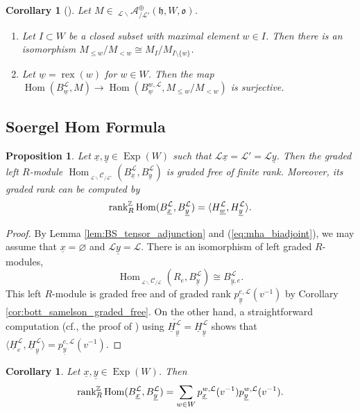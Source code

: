 \documentclass{amsart}
\newcommand{\Z}{\mathbb{Z}}
\newcommand{\scrL}{\mathcal{L}}
\DeclareMathOperator{\Hom}{Hom}
\newcommand{\fr}[1]{\mathfrak{#1}}
\DeclareMathOperator{\rex}{rex}
\newcommand{\Cmon}[2]{\:_{#1 \backslash} \mathcal{C}_{/ #2} }
\newcommand{\Amon}[2]{\:_{#1 \backslash} \mathcal{A}_{/ #2} }
\newcommand{\uH}{\underline{H}}
\DeclareMathOperator{\Exp}{Exp}
\newcommand{\uw}{\underline{w}}
\newcommand{\ux}{\underline{x}}
\newcommand{\uy}{\underline{y}}
\newcommand{\grk}{\textnormal{rank}^{\Z}}
\renewcommand{\emptyset}{\varnothing}
\newtheorem{corollary}[subsubsection]{Corollary}
\newtheorem{proposition}[subsubsection]{Proposition}
\theoremstyle{definition}
\numberwithin{equation}{subsection}
\begin{document}
\begin{corollary}[{\cite[Corollary 3.18]{Abe19}}]\label{cor:when_other_w_invs_is_surj}
    Let $M \in \Amon{\scrL}{\scrL'}^{\oplus} (\fr{h}, W, \fr{o})$.
    \begin{enumerate}
        \item Let $I \subset W$ be a closed subset with maximal element $w \in I$. Then there is an isomorphism $M_{\leq w}/M_{<w} \cong M_{I}/M_{I \setminus \{w\}}$.
        \item Let $\uw = \rex (w)$ for $w \in W$. Then the map $\Hom (B_{\uw}^{\scrL}, M) \to \Hom (B_{\uw}^{w, \scrL}, M_{\leq w} / M_{<w})$ is surjective.
    \end{enumerate}
\end{corollary}

\subsection{Soergel Hom Formula}

\begin{proposition}\label{prop:abe_soergel_hom_formula}
    Let $\ux, \uy \in \Exp (W)$ such that $\scrL \ux = \scrL' = \scrL \uy$.
    Then the graded left $R$-module $\Hom_{\Cmon{\scrL}{\scrL'}} (B_{\ux}^{\scrL}, B_{\uy}^{\scrL})$ is graded free of finite rank. Moreover, its graded rank can be computed by
    \[\grk_R \Hom (B_{\ux}^{\scrL}, B_{\uy}^{\scrL}) = \langle H_{\uw}^{\scrL}, H_{\uy}^{\scrL} \rangle.\]
\end{proposition}
\begin{proof}
    By Lemma \ref{lem:BS_tensor_adjunction} and (\ref{eq:mha_biadjoint}), we may assume that $\ux = \emptyset$ and $\scrL \uy = \scrL$.
    There is an isomorphism of left graded $R$-modules,
    \[\Hom_{\Cmon{\scrL}{\scrL}} (R_e, B_{\uy}^{\scrL}) \cong B_{\uy, e}^{\scrL}.\]
    This left $R$-module is graded free and of graded rank $p_{\uy}^{e, \scrL} (v^{-1})$ by Corollary \ref{cor:bott_samelson_graded_free}. 
    On the other hand, a straightforward computation (cf., the proof of \cite[Theorem 4.6]{Abe19}) using $\overline{\uH_{\uy}^{\scrL}} = \uH_{\uy}^{\scrL}$ shows that 
    $\langle \uH_{e}^{\scrL}, \uH_{\uy}^{\scrL} \rangle = p_{\uy}^{e, \scrL} (v^{-1})$.
\end{proof}

\begin{corollary}\label{cor:abe_soergel_hom_application}
    Let $\ux, \uy \in \Exp (W)$.
    Then 
    \[\grk_R \Hom (B_{\ux}^{\scrL}, B_{\uy}^{\scrL}) = \sum_{w \in W} p_{\ux}^{w, \scrL} (v^{-1}) p_{\uy}^{w, \scrL} (v^{-1}).\]
\end{corollary}
\end{document}
